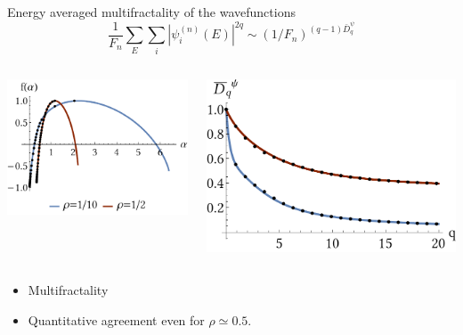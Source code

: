 \documentclass[xcolor=x11names,compress,professionalfonts]{beamer}
\renewcommand{\(}{\begin{columns}}
\renewcommand{\)}{\end{columns}}
\newcommand{\<}[1]{\begin{column}{#1}}
\renewcommand{\>}{\end{column}}
\begin{document}
\begin{frame}{Energy averaged multifractality of the wavefunctions}
\[ 
	\frac{1}{F_n} \sum_E \sum_i |\psi_i^{(n)}(E)|^{2q}  \sim (1/F_n)^{(q-1)\bar{D}_q^\psi}
\]
\begin{columns}
	\begin{column}{5cm}
		\centering
		\includegraphics[scale=.6]{falpha_av.pdf}
	\end{column}
	\begin{column}{5cm}
		\centering
		\includegraphics[scale=.4]{dq_av.pdf}
	\end{column}
\end{columns}
		\begin{itemize}
			\item Multifractality
			\item Quantitative agreement even for $\rho \simeq 0.5$.
		\end{itemize}

\end{frame}
\end{document}
